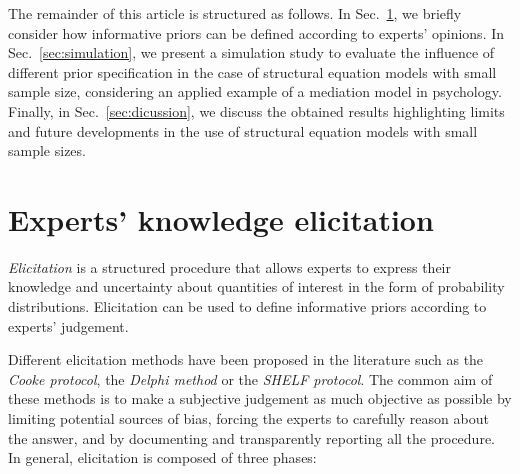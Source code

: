 \documentclass[graybox]{svmult}
\begin{document}
The remainder of this article is structured as follows. In Sec.~\ref{sec:expert_elicitation}, we briefly consider how informative priors can be defined according to experts' opinions. In Sec.~\ref{sec:simulation}, we present a simulation study to evaluate the influence of different prior specification in the case of structural equation models with small sample size, considering an applied example of a mediation model in psychology. Finally, in Sec.~\ref{sec:dicussion}, we discuss the obtained results highlighting limits and future developments in the use of structural equation models with small sample sizes.

\section{Experts' knowledge elicitation}
\label{sec:expert_elicitation}

\emph{Elicitation} is a structured procedure that allows experts to express their knowledge and uncertainty about quantities of interest in the form of probability distributions. Elicitation can be used to define informative priors according to  experts' judgement.

Different elicitation methods have been proposed in the literature such as the \emph{Cooke protocol}, the \emph{Delphi method} or the \emph{SHELF protocol}. The common aim of these methods is to make a subjective judgement as much objective as possible by limiting potential sources of bias, forcing the experts to carefully reason about the answer, and by documenting and transparently reporting all the procedure. In general, elicitation is composed of three phases:
\end{document}

